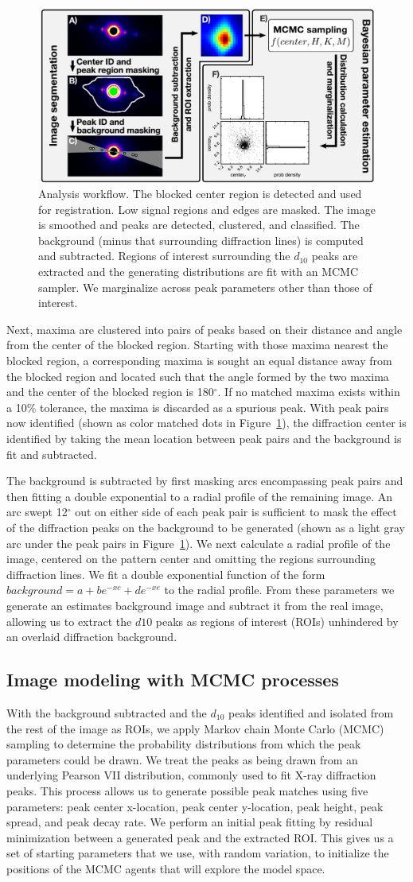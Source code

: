 \documentclass{sig-alternate}
\newcommand{\figureworkflow}{
\begin{figure}[tbp]
  \centering
  \includegraphics[width=\linewidth]{figures/img_analysis}
  \vspace{-8pt}
  \caption{\label{fig:workflow}
  	Analysis workflow.
    The blocked center region is detected and used for registration.
    Low signal regions and edges are masked. The image is smoothed and
    peaks are detected, clustered, and classified. The background
    (minus that surrounding diffraction lines) is computed and
    subtracted. Regions of interest surrounding the $d_{10}$ peaks are
    extracted and the generating distributions are fit with an MCMC
    sampler. We marginalize across peak parameters other than those of
    interest.  
	}
	\vspace{-2pt}
\end{figure}
}
\begin{document}
\figureworkflow

Next, maxima are clustered into pairs of peaks based on their distance
and angle from the center of the blocked region. Starting with those
maxima nearest the blocked region, a corresponding maxima is sought an
equal distance away from the blocked region and located such that the
angle formed by the two maxima and the center of the blocked region is
180$^\circ$. If no matched maxima exists within a 10\% tolerance, the
maxima is discarded as a spurious peak. With peak pairs now identified
(shown as color matched dots in Figure~\ref{fig:workflow}), the
diffraction center is identified by taking the mean location between
peak pairs and the background is fit and subtracted. 

The background is subtracted by first masking arcs encompassing peak
pairs and then fitting a double exponential to a radial profile of the
remaining image. An arc swept 12$^\circ$ out on either side of each
peak pair is sufficient to mask the effect of the diffraction peaks on
the background to be generated (shown as a light gray arc under the
peak pairs in Figure~\ref{fig:workflow}). We next calculate a radial
profile of the image, centered on the pattern center and omitting the
regions surrounding diffraction lines. We fit a double exponential
function of the form $background = a+ b e^{-x c} + d e^{-x e}$ to the
radial profile. From these parameters we generate an estimates
background image and subtract it from the real image, allowing us to
extract the $d{10}$ peaks as regions of interest (ROIs) unhindered by
an overlaid diffraction background. 

\subsection{Image modeling with MCMC processes}

With the background subtracted and the $d_{10}$ peaks identified and
isolated from the rest of the image as ROIs, we apply Markov chain
Monte Carlo (MCMC) sampling to determine the probability distributions
from which the peak parameters could be drawn. We treat the peaks as
being drawn from an underlying Pearson VII distribution, commonly used
to fit X-ray diffraction peaks. This process allows us to generate
possible peak matches using five parameters: peak center x-location,
peak center y-location, peak height, peak spread, and peak decay rate.
We perform an initial peak fitting by residual minimization between a
generated peak and the extracted ROI. This gives us a set of starting
parameters that we use, with random variation, to initialize the
positions of the MCMC agents that will explore the model space. 
\end{document}
